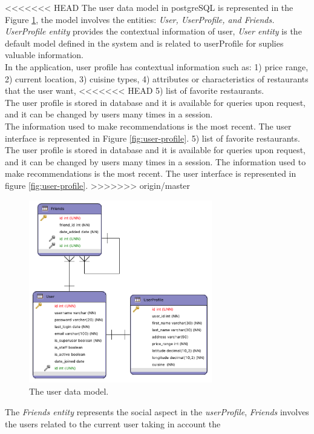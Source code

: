 <<<<<<< HEAD
The user data model in postgreSQL is represented in the 
Figure  \ref{fig:datausermodel}, the model involves the entities:
\textit{User, UserProfile, and Friends.} \textit{UserProfile entity}
provides the contextual information of user, \textit{User entity} is
the default model defined in the system and is related to userProfile
for suplies valuable information. \\
In the application, user profile has contextual
information such as: 1) price range, 2) current location, 3) cuisine
types, 4) attributes or characteristics of restaurants that the user want, 
<<<<<<< HEAD
5) list of  favorite restaurants.  \\ 
The user profile is stored in database and it is available for 
queries upon request, and it can be changed by users many times 
in a session. \\ The information used to make recommendations 
is the most recent. The user interface is represented in 
Figure  \ref{fig:user-profile}.
5) list of  favorite restaurants.  
The user profile is stored in database and it is available for 
queries upon request, and it can be changed by users many times 
in a session. The information used to make recommendations 
is the most recent. The user interface is represented in 
figure \ref{fig:user-profile}.
>>>>>>> origin/master
\begin{figure}
\captionsetup{font=footnotesize}
\centering
\includegraphics[width=8cm,height=8cm,keepaspectratio]
{img/data-usermodel.png}
\caption{The user data model.}
\label{fig:datausermodel}     
\end{figure}
The \textit{Friends entity}
represents the social aspect in the \textit{userProfile}, \textit{Friends} involves
the users related to the current user taking in account the
